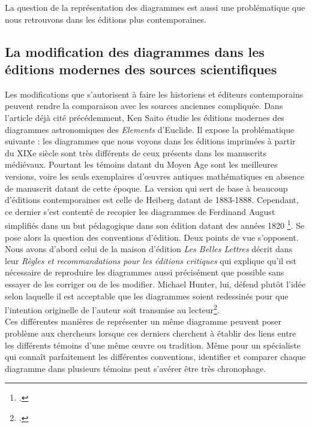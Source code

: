 La question de la représentation des diagrammes est aussi une problématique que nous retrouvons dans les éditions plus contemporaines.

\subsection{La modification des diagrammes dans les éditions modernes des sources scientifiques}

Les modifications que s'autorisent à faire les historiens et éditeurs contemporains peuvent rendre la comparaison avec les sources anciennes compliquée. Dans l'article déjà cité précédemment, Ken Saito étudie les éditions modernes des diagrammes astronomiques des \textit{Elements} d'Euclide. Il expose la problématique suivante : les diagrammes que nous voyons dans les éditions imprimées à partir du XIXe siècle sont très différents de ceux présents dans les manuscrits médiévaux. Pourtant les témoins datant du Moyen Age sont les meilleures versions, voire les seuls exemplaires d'œuvres antiques mathématiques en absence de manuscrit datant de cette époque. La version qui sert de base à beaucoup d'éditions contemporaines est celle de Heiberg datant de 1883-1888. Cependant, ce dernier s'est contenté de recopier les diagrammes de Ferdinand August simplifiés dans un but pédagogique dans son édition datant des années 1820 \footcite{saitoTraditionsDiagramTradition2012}. Se pose alors la question des conventions d'édition. Deux points de vue s'opposent. Nous avons d'abord celui de la maison d'édition \textit{Les Belles Lettres} décrit dans leur \textit{Règles et recommandations pour les éditions critiques} qui explique qu'il est nécessaire de reproduire les diagrammes aussi précisément que possible sans essayer de les corriger ou de les modifier. Michael Hunter, lui, défend plutôt l'idée selon laquelle il est acceptable que les diagrammes soient redessinés pour que l'intention originelle de l'auteur soit transmise au lecteur\footcite{jardineCriticalEditingEarlyModern2010}.\\

Ces différentes manières de représenter un même diagramme peuvent poser problème aux chercheurs lorsque ces derniers cherchent à établir des liens entre les différents témoins d'une même œuvre ou tradition. Même pour un spécialiste qui connaît parfaitement les différentes conventions, identifier et comparer chaque diagramme dans plusieurs témoins peut s'avérer être très chronophage.